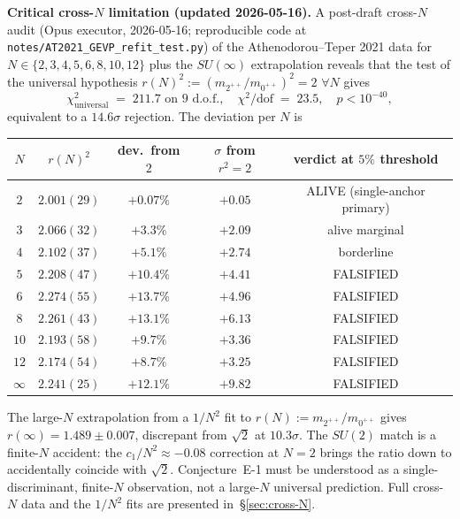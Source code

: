 \documentclass[11pt,a4paper]{amsart}
\theoremstyle{definition}
\begin{document}
\textbf{Critical cross-$N$ limitation (updated 2026-05-16).}
A post-draft cross-$N$ audit (Opus executor, 2026-05-16; reproducible
code at \texttt{notes/AT2021\_GEVP\_refit\_test.py}) of the
Athenodorou--Teper 2021 data for $N \in \{2, 3, 4, 5, 6, 8, 10, 12\}$
plus the $SU(\infty)$ extrapolation \cite[Table 38]{AthenodorouTeper2021}
reveals that the test of the universal hypothesis $r(N)^{2} :=
(m_{2^{++}}/m_{0^{++}})^{2} = 2$ $\forall N$ gives
\begin{equation}\label{eq:cross-N-chi2}
\chi^{2}_{\text{universal}} \;=\; 211.7 \text{ on } 9 \text{ d.o.f.}, \quad
\chi^{2}/\text{dof} \;=\; 23.5, \quad p < 10^{-40},
\end{equation}
equivalent to a $14.6\sigma$ rejection. The deviation per $N$ is

\begin{center}
\begin{tabular}{ccccc}
\toprule
$N$ & $r(N)^2$ & dev.\ from $2$ & $\sigma$ from $r^{2}=2$ & verdict at $5\%$ threshold \\
\midrule
$2$  & $2.001(29)$ & $+0.07\%$  & $+0.05$  & ALIVE (single-anchor primary) \\
$3$  & $2.066(32)$ & $+3.3\%$   & $+2.09$  & alive marginal \\
$4$  & $2.102(37)$ & $+5.1\%$   & $+2.74$  & borderline \\
$5$  & $2.208(47)$ & $+10.4\%$  & $+4.41$  & FALSIFIED \\
$6$  & $2.274(55)$ & $+13.7\%$  & $+4.96$  & FALSIFIED \\
$8$  & $2.261(43)$ & $+13.1\%$  & $+6.13$  & FALSIFIED \\
$10$ & $2.193(58)$ & $+9.7\%$   & $+3.36$  & FALSIFIED \\
$12$ & $2.174(54)$ & $+8.7\%$   & $+3.25$  & FALSIFIED \\
$\infty$ & $2.241(25)$ & $+12.1\%$ & $+9.82$ & FALSIFIED \\
\bottomrule
\end{tabular}
\end{center}

The large-$N$ extrapolation from a $1/N^{2}$ fit to
$r(N) := m_{2^{++}}/m_{0^{++}}$ gives $r(\infty) = 1.489 \pm 0.007$,
discrepant from $\sqrt{2}$ at $10.3\sigma$. The $SU(2)$ match is a
finite-$N$ accident: the $c_{1}/N^{2} \approx -0.08$ correction at
$N=2$ brings the ratio down to accidentally coincide with $\sqrt{2}$.
Conjecture~E-1 must be understood as a single-discriminant,
finite-$N$ observation, not a large-$N$ universal prediction.
Full cross-$N$ data and the $1/N^{2}$ fits are presented
in~\S\ref{sec:cross-N}.
\end{document}
